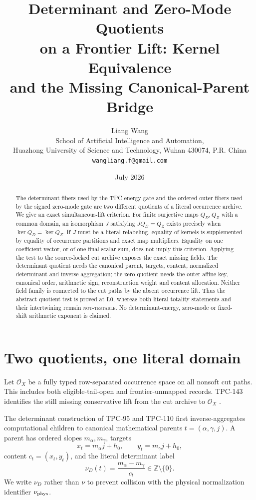\documentclass[11pt]{article}
\title{\textbf{Determinant and Zero-Mode Quotients}\\
\textbf{on a Frontier Lift: Kernel Equivalence}\\
\textbf{and the Missing Canonical-Parent Bridge}}
\author{Liang Wang\\
School of Artificial Intelligence and Automation,\\
Huazhong University of Science and Technology, Wuhan 430074, P.R. China\\
\texttt{wangliang.f@gmail.com}}
\date{July 2026}
\theoremstyle{definition}
\theoremstyle{remark}
\begin{document}
\maketitle

\begin{abstract}
The determinant fibers used by the TPC energy gate and the ordered
outer fibers used by the signed zero-mode gate are two different
quotients of a literal occurrence archive.  We give an exact
simultaneous-lift criterion.  For finite surjective maps \(Q_D,Q_Z\)
with a common domain, an isomorphism \(J\) satisfying
\(JQ_D=Q_Z\) exists precisely when
\(\ker Q_D=\ker Q_Z\).  If \(J\) must be a literal relabeling, equality
of kernels is supplemented by equality of occurrence partitions and
exact map multipliers.  Equality on one coefficient vector, or of
one final scalar sum, does not imply this criterion.  Applying the
test to the source-locked cut archive exposes the exact missing
fields.  The determinant quotient needs the canonical parent,
targets, content, normalized determinant and inverse aggregation;
the zero quotient needs the outer affine key, canonical order,
arithmetic sign, reconstruction weight and content allocation.
Neither field family is connected to the cut paths by the absent
occurrence lift.  Thus the abstract quotient test is proved at
\(\mathrm{L0}\), whereas both literal totality statements and their
intertwining remain \textsc{not-testable}.  No determinant-energy,
zero-mode or fixed-shift arithmetic exponent is claimed.
\end{abstract}

\section{Two quotients, one literal domain}

Let \(\mathcal O_X\) be a fully typed row-separated occurrence space
on all nonsoft cut paths.  This includes both eligible-tail-open and
frontier-unmapped records.  TPC-143 identifies the still missing
conservative lift from the cut archive to \(\mathcal O_X\)
\citep{WangTPC136,WangTPC143}.

The determinant construction of TPC-95 and TPC-110 first
inverse-aggregates computational children to canonical mathematical
parents \(t=(\alpha,\gamma,j)\).  A parent has ordered slopes
\(m_\alpha,m_\gamma\), targets
\[
 x_t=m_\alpha j+h_0,\qquad y_t=m_\gamma j+h_0,
\]
content \(c_t=(x_t,y_t)\), and the literal determinant label
\begin{equation}
 \nu_D(t)=\frac{m_\alpha-m_\gamma}{c_t}\in\mathbb Z\setminus\{0\}.
 \label{eq:detlabel}
\end{equation}
We write \(\nu_D\) rather than \(\nu\) to prevent collision with the
physical normalization identifier \(\nu_{\rm phys}\).
\end{document}
